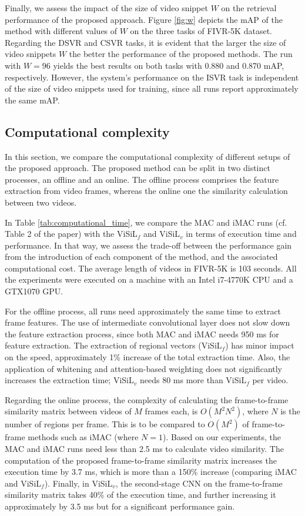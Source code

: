 \documentclass[10pt,twocolumn,letterpaper]{article}
\begin{document}
Finally, we assess the impact of the size of video snippet $W$ on the retrieval performance of the proposed approach. Figure \ref{fig:w} depicts the mAP of the method with different values of $W$ on the three tasks of FIVR-5K dataset. Regarding the DSVR and CSVR tasks, it is evident that the larger the size of video snippets $W$ the better the performance of the proposed methods. The run with $W=96$ yields the best results on both tasks with 0.880 and 0.870 mAP, respectively. However, the system's performance on the ISVR task is independent of the size of video snippets used for training, since all runs report approximately the same mAP.




\subsection{Computational complexity}
In this section, we compare the computational complexity of different setups of the proposed approach. The proposed method can be split in two distinct processes, an offline and an online. The offline process comprises the feature extraction from video frames, whereas the online one the similarity calculation between two videos. 

In Table \ref{tab:computational_time}, we compare the MAC and iMAC runs (cf. Table 2 of the paper) with the ViSiL$_f$ and ViSiL$_v$ in terms of execution time and performance. In that way, we assess the trade-off between the performance gain from the introduction of each component of the method, and the associated computational cost. The average length of videos in FIVR-5K is 103 seconds. All the experiments were executed on a machine with an Intel i7-4770K CPU and a GTX1070 GPU.

For the offline process, all runs need approximately the same time to extract frame features. The use of intermediate convolutional layer does not slow down the feature extraction process, since both MAC and iMAC needs 950 ms for feature extraction. The extraction of regional vectors (ViSiL$_f$) has minor impact on the speed, approximately 1\% increase of the total extraction time. Also, the application of whitening and attention-based weighting does not significantly increases the extraction time; ViSiL$_v$ needs 80 ms more than ViSiL$_f$ per video.

Regarding the online process, the complexity of calculating the frame-to-frame similarity matrix between videos of $M$ frames each, is $O(M^2 N^2)$, where $N$ is the number of regions per frame. This is to be compared to $O(M^2)$ of frame-to-frame methods such as iMAC (where $N=1$). Based on our experiments, the MAC and iMAC runs need less than 2.5 ms to calculate video similarity. The computation of the proposed frame-to-frame similarity matrix increases the execution time by 3.7 ms, which is more than a 150\% increase (comparing iMAC and ViSiL$_f$). Finally, in ViSiL$_v$, the second-stage CNN on the frame-to-frame similarity matrix takes 40\% of the execution time, and further increasing it approximately by 3.5 ms but for a significant performance gain. 
\end{document}
